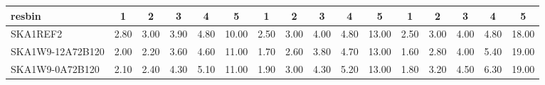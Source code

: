 \begin{table}[!htp]
{{\begin{tabular}{|lccccc||ccccc||ccccc|}
 resbin  &1 & 2 & 3 & 4 & 5 & 1 & 2 & 3 & 4 & 5 & 1 & 2 & 3 & 4 & 5 \\ \hline
SKA1REF2 & 2.80 \cellcolor{blue!60.00} & 3.00 \cellcolor{red!60.00} & 3.90 \cellcolor{green!36.00} & 4.80 \cellcolor{orange!34.80} & 10.00 \cellcolor{purple!18.00} & 2.50 \cellcolor{blue!60.00} & 3.00 \cellcolor{red!60.00} & 4.00 \cellcolor{green!34.80} & 4.80 \cellcolor{orange!26.40} & 13.00 \cellcolor{purple!18.00} & 2.50 \cellcolor{blue!60.00} & 3.00 \cellcolor{red!39.00} & 4.00 \cellcolor{green!18.00} & 4.80 \cellcolor{orange!18.00} & 18.00 \cellcolor{purple!18.00}\\ \hline 
SKA1W9-12A72B120 & 2.00 \cellcolor{blue!18.00} & 2.20 \cellcolor{red!18.00} & 3.60 \cellcolor{green!18.00} & 4.60 \cellcolor{orange!18.00} & 11.00 \cellcolor{purple!60.00} & 1.70 \cellcolor{blue!18.00} & 2.60 \cellcolor{red!18.00} & 3.80 \cellcolor{green!18.00} & 4.70 \cellcolor{orange!18.00} & 13.00 \cellcolor{purple!18.00} & 1.60 \cellcolor{blue!18.00} & 2.80 \cellcolor{red!18.00} & 4.00 \cellcolor{green!18.00} & 5.40 \cellcolor{orange!34.80} & 19.00 \cellcolor{purple!60.00}\\ \hline 
SKA1W9-0A72B120 & 2.10 \cellcolor{blue!23.25} & 2.40 \cellcolor{red!28.50} & 4.30 \cellcolor{green!60.00} & 5.10 \cellcolor{orange!60.00} & 11.00 \cellcolor{purple!60.00} & 1.90 \cellcolor{blue!28.50} & 3.00 \cellcolor{red!60.00} & 4.30 \cellcolor{green!60.00} & 5.20 \cellcolor{orange!60.00} & 13.00 \cellcolor{purple!18.00} & 1.80 \cellcolor{blue!27.33} & 3.20 \cellcolor{red!60.00} & 4.50 \cellcolor{green!60.00} & 6.30 \cellcolor{orange!60.00} & 19.00 \cellcolor{purple!60.00}\\ \hline 
\end{tabular}}
\hspace{1cm} 
}
\end{table}
